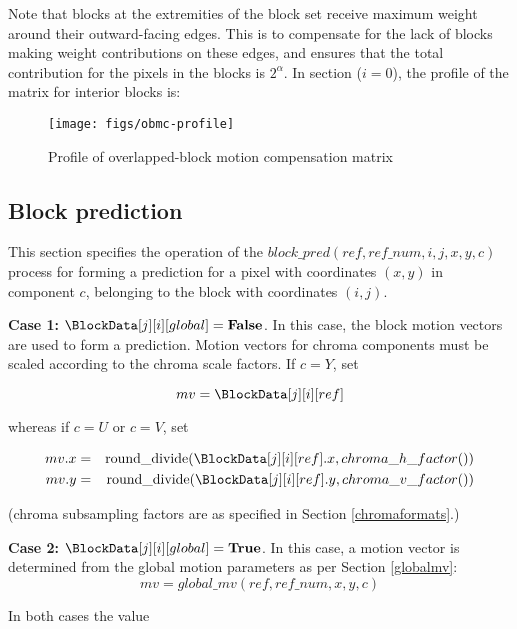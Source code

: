 Note that blocks at the extremities of the block set receive maximum weight around their outward-facing edges.
This is to compensate for the lack of blocks making weight contributions on these edges, and ensures that
the total contribution for the pixels in the blocks is $2^{\alpha}$. In section ($i=0$), the profile of the matrix 
for interior blocks is:

\begin{figure}[!h]
\centering
\texttt{[image: figs/obmc-profile]}
\caption{Profile of overlapped-block motion compensation matrix}
\label{fig:weightprofile}
\end{figure}

\subsection{Block prediction}
\label{blockprediction}

This section specifies the operation of the $block\_pred(ref, ref\_num, i, j, x, y, c)$ 
process for forming a prediction for a pixel 
with coordinates $(x,y)$ in component $c$, belonging to the block with coordinates $(i,j)$.

{\bf Case 1: $\BlockData[j][i][global]=\false$}. In this case, the block motion vectors are used to form a prediction.
Motion vectors for chroma components must be scaled according to the chroma scale factors. If $c=Y$, set

\begin{equation*}
mv= \BlockData[j][i][ref]
\end{equation*}

whereas if $c=U$ or $c=V$, set

\begin{eqnarray*}
mv.x & = & \rounddivide(\BlockData[j][i][ref].x, chroma\_h\_factor() ) \\
mv.y & = & \rounddivide(\BlockData[j][i][ref].y, chroma\_v\_factor() )
\end{eqnarray*}

(chroma subsampling factors are as specified in Section \ref{chromaformats}.)

{\bf Case 2: $\BlockData[j][i][global]=\true$}. In this case, a motion vector is determined from the global
motion parameters as per Section \ref{globalmv}:
\begin{equation*}
mv=global\_mv(ref, ref\_num, x, y, c)
\end{equation*}

In both cases the value 

